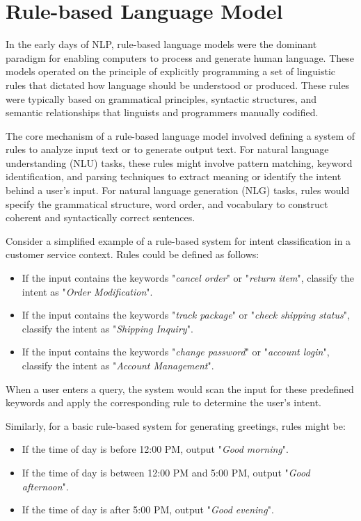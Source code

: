 \section{Rule-based Language Model}

In the early days of NLP, rule-based language models were the dominant paradigm for enabling computers to process and generate human language. These models operated on the principle of explicitly programming a set of linguistic rules that dictated how language should be understood or produced. These rules were typically based on grammatical principles, syntactic structures, and semantic relationships that linguists and programmers manually codified.

The core mechanism of a rule-based language model involved defining a system of rules to analyze input text or to generate output text. For natural language understanding (NLU) tasks, these rules might involve pattern matching, keyword identification, and parsing techniques to extract meaning or identify the intent behind a user's input. For natural language generation (NLG) tasks, rules would specify the grammatical structure, word order, and vocabulary to construct coherent and syntactically correct sentences.

Consider a simplified example of a rule-based system for intent classification in a customer service context. Rules could be defined as follows:

\begin{itemize}
    \item If the input contains the keywords "\textit{cancel order}" or "\textit{return item}", classify the intent as "\textit{Order Modification}".
    \item If the input contains the keywords "\textit{track package}" or "\textit{check shipping status}", classify the intent as "\textit{Shipping Inquiry}".
    \item If the input contains the keywords "\textit{change password}" or "\textit{account login}", classify the intent as "\textit{Account Management}".
\end{itemize}

When a user enters a query, the system would scan the input for these predefined keywords and apply the corresponding rule to determine the user's intent.

Similarly, for a basic rule-based system for generating greetings, rules might be:

\begin{itemize}
    \item If the time of day is before 12:00 PM, output "\textit{Good morning}".
    \item If the time of day is between 12:00 PM and 5:00 PM, output "\textit{Good afternoon}".
    \item If the time of day is after 5:00 PM, output "\textit{Good evening}".
\end{itemize}

